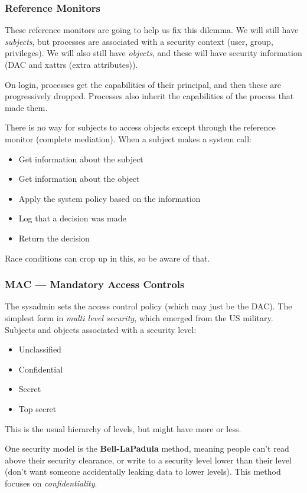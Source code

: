 \documentclass[11pt,a4paper,titlepage,dvipsnames,cmyk]{scrartcl}
\begin{document}
\subsubsection{Reference Monitors}
These reference monitors are going to help us fix this dilemma. We will still have \textit{subjects}, but processes are associated with a security context (user, group, privileges). We will also still have \textit{objects}, and these will have security information (DAC and xattrs (extra attributes)).

On login, processes get the capabilities of their principal, and then these are progressively dropped. Processes also inherit the capabilities of the process that made them.

There is no way for subjects to access objects except through the reference monitor (complete mediation). When a subject makes a system call:
\begin{itemize}
    \item Get information about the subject
    \item Get information about the object
    \item Apply the system policy based on the information
    \item Log that a decision was made
    \item Return the decision
\end{itemize}

Race conditions can crop up in this, so be aware of that.

\subsubsection{MAC --- Mandatory Access Controls}
The sysadmin sets the access control policy (which may just be the DAC). The simplest form in \textit{multi level security}, which emerged from the US military. Subjects and objects associated with a security level:
\begin{itemize}
    \item Unclassified
    \item Confidential
    \item Secret
    \item Top secret
\end{itemize}

This is the usual hierarchy of levels, but might have more or less.

One security model is the \textbf{Bell-LaPadula} method, meaning people can't read above their security clearance, or write to a security level lower than their level (don't want someone accidentally leaking data to lower levels). This method focuses on \textit{confidentiality}.
\end{document}

